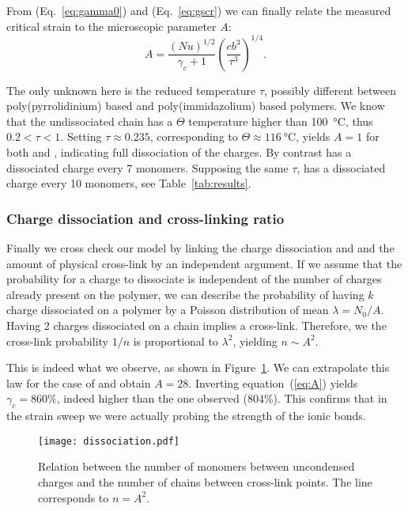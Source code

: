 \documentclass[journal=jacsat,manuscript=article]{achemso}
\begin{document}
From (Eq.~\ref{eq:gamma0}) and (Eq.~\ref{eq:gscr}) we can finally relate the measured critical strain to the microscopic parameter $A$:
\begin{equation}
A = \frac{\left(N u\right)^{1/2}}{\gamma_c+1}\left(\frac{c b^3}{\tau^3}\right)^{1/4}.
\label{eq:A}
\end{equation}

The only unknown here is the reduced temperature $\tau$, possibly different between poly(pyrrolidinium) based and poly(immidazolium) based polymers. We know that the undissociated chain has a $\Theta$ temperature higher than \SI{100}{\celsius}, thus $0.2<\tau<1$. Setting $\tau\approx 0.235$, corresponding to $\Theta\approx\SI{116}{\celsius}$, yields $A=1$ for both  and , indicating full dissociation of the charges. By contrast  has a dissociated charge every 7 monomers. Supposing the same $\tau$,  has a dissociated charge every 10 monomers, see Table~\ref{tab:results}.

\subsubsection{Charge dissociation and cross-linking ratio}

Finally we cross check our model by linking the charge dissociation and and the amount of physical cross-link by an independent argument. If we assume that the probability for a charge to dissociate is independent of the number of charges already present on the polymer, we can describe the probability of having $k$ charge dissociated on a polymer by a Poisson distribution of mean $\lambda = N_0/A$. Having 2 charges dissociated on a chain implies a cross-link. Therefore, we the cross-link probability $1/n$ is proportional to $\lambda^2$, yielding $n \sim A^2$.

This is indeed what we observe, as shown in Figure~\ref{fig:dissociation}. We can extrapolate this law for the case of  and obtain $A = 28$. Inverting equation~(\ref{eq:A}) yields $\gamma_c = 860\%$, indeed higher than the one observed (804\%). This confirms that in the  strain sweep we were actually probing the strength of the ionic bonds.

\begin{figure}
\begin{center}
\texttt{[image: dissociation.pdf]}
\end{center}
\caption{Relation between the number of monomers between uncondensed charges and the number of chains between cross-link points. The line corresponds to $n = A^2$.}
\label{fig:dissociation}
\end{figure}
\end{document}
